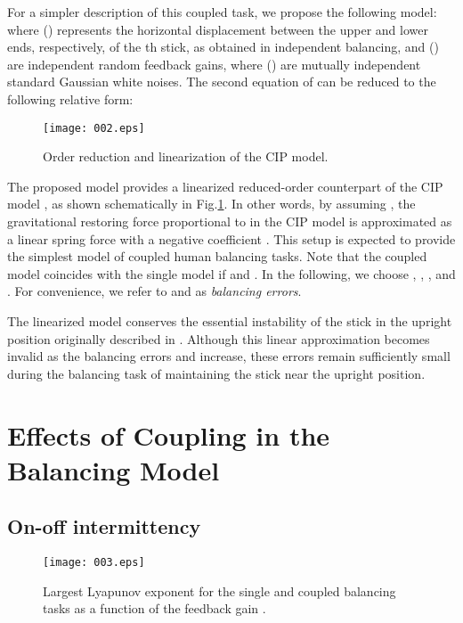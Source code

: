\documentclass[12pt,a4paper]{ijicic}
\def\lfig#1{\label{fig:#1}}\def\rfig#1{Fig.\ref{fig:#1}}
\begin{document}
For a simpler description of this coupled task, we propose
the following model:
where  () represents the horizontal
displacement between the upper and lower ends, respectively, of the
th stick, as obtained in independent balancing, and  () are independent random feedback gains, where
 () are mutually independent standard Gaussian white
noises. The second equation of  can be reduced to the
following relative form:


\begin{figure}[t]
 \centering\par
 \texttt{[image: 002.eps]}
 \caption{Order reduction and linearization of the CIP model.}
 \lfig{1dmodel}
\end{figure}

The proposed model  provides a linearized reduced-order
counterpart of the CIP model \cite{JSDD08}, as shown schematically in
\rfig{1dmodel}. In other words, by assuming , the
gravitational restoring force proportional to  in the CIP
model is approximated as a linear spring force with a negative
coefficient .  This setup is expected to provide the simplest
model of coupled human balancing tasks.  Note that the coupled model
 coincides with the single model  if
 and .  In the following, we choose
, , , and .  For convenience,
we refer to  and  as {\em balancing errors}.

 The linearized model  conserves the essential
 instability of the stick in the upright position originally described
 in .  Although this linear approximation becomes invalid
 as the balancing errors  and  increase, these errors remain
 sufficiently small during the balancing task of maintaining the stick
 near the upright position.

\section{Effects of Coupling in the Balancing Model}

\subsection{On-off intermittency}

\begin{figure}[t]
 \centering
 \texttt{[image: 003.eps]}
\caption{Largest Lyapunov exponent  for the single and
 coupled balancing tasks as a function of the feedback gain .}
\lfig{lLe}
\end{figure}
\end{document}
